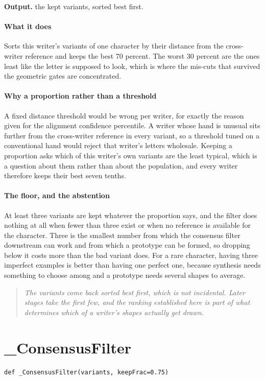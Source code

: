 \noindent\textbf{Output.} the kept variants, sorted best first.


\paragraph{What it does}
Sorts this writer's variants of one character by their distance from the cross-writer reference and keeps the best 70 percent. The worst 30 percent are the ones least like the letter is supposed to look, which is where the mis-cuts that survived the geometric gates are concentrated.


\paragraph{Why a proportion rather than a threshold}
A fixed distance threshold would be wrong per writer, for exactly the reason given for the alignment confidence percentile. A writer whose hand is unusual sits further from the cross-writer reference in every variant, so a threshold tuned on a conventional hand would reject that writer's letters wholesale. Keeping a proportion asks which of this writer's own variants are the least typical, which is a question about them rather than about the population, and every writer therefore keeps their best seven tenths.


\paragraph{The floor, and the abstention}
At least three variants are kept whatever the proportion says, and the filter does nothing at all when fewer than three exist or when no reference is available for the character. Three is the smallest number from which the consensus filter downstream can work and from which a prototype can be formed, so dropping below it costs more than the bad variant does. For a rare character, having three imperfect examples is better than having one perfect one, because synthesis needs something to choose among and a prototype needs several shapes to average.


\begin{quote}\small\itshape The variants come back sorted best first, which is not incidental. Later stages take the first few, and the ranking established here is part of what determines which of a writer's shapes actually get drawn.\end{quote}

\section{\_ConsensusFilter}
\begin{lstlisting}[style=sig]
def _ConsensusFilter(variants, keepFrac=0.75)
\end{lstlisting}

